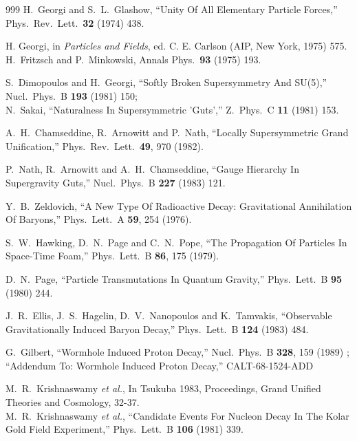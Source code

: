 \begin{thebibliography}{999}
  H.~Georgi and S.~L.~Glashow,
  ``Unity Of All Elementary Particle Forces,''
  Phys.\ Rev.\ Lett.\  {\bf 32} (1974) 438.

H. Georgi, in \textit{Particles and Fields}, ed. C. E. Carlson (AIP,
New York, 1975) 575. 
H.~Fritzsch and P.~Minkowski, Annals Phys.\  {\bf 93} (1975) 193.

  S.~Dimopoulos and H.~Georgi,
  ``Softly Broken Supersymmetry And SU(5),''
  Nucl.\ Phys.\ B {\bf 193} (1981) 150;
\\
 N.~Sakai,
  ``Naturalness In Supersymmetric 'Guts',''
  Z.\ Phys.\ C {\bf 11} (1981) 153.

  A.~H.~Chamseddine, R.~Arnowitt and P.~Nath,
  ``Locally Supersymmetric Grand Unification,''
  Phys.\ Rev.\ Lett.\  {\bf 49}, 970 (1982).

  P.~Nath, R.~Arnowitt and A.~H.~Chamseddine,
  ``Gauge Hierarchy In Supergravity Guts,''
  Nucl.\ Phys.\ B {\bf 227} (1983) 121.

  Y.~B.~Zeldovich,
  ``A New Type Of Radioactive Decay: Gravitational Annihilation Of Baryons,''
  Phys.\ Lett.\ A {\bf 59}, 254 (1976).

  S.~W.~Hawking, D.~N.~Page and C.~N.~Pope,
  ``The Propagation Of Particles In Space-Time Foam,''
  Phys.\ Lett.\ B {\bf 86}, 175 (1979).

  D.~N.~Page,
  ``Particle Transmutations In Quantum Gravity,''
  Phys.\ Lett.\ B {\bf 95} (1980) 244.

  J.~R.~Ellis, J.~S.~Hagelin, D.~V.~Nanopoulos and K.~Tamvakis,
  ``Observable Gravitationally Induced Baryon Decay,''
  Phys.\ Lett.\ B {\bf 124} (1983) 484.

  G.~Gilbert,
  ``Wormhole Induced Proton Decay,''
  Nucl.\ Phys.\ B {\bf 328}, 159 (1989)
;
  ``Addendum To: Wormhole Induced Proton Decay,''
CALT-68-1524-ADD

  M.~R.~Krishnaswamy {\it et al.},
In Tsukuba 1983, Proceedings, Grand Unified Theories and Cosmology, 32-37.
\\
M.~R.~Krishnaswamy {\it et al.},
  ``Candidate Events For Nucleon Decay In The Kolar Gold Field Experiment,''
  Phys.\ Lett.\ B {\bf 106} (1981) 339.


\end{thebibliography}
